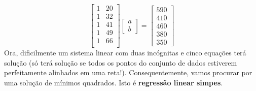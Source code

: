 \documentclass[../livro.tex]{subfiles}  %
\begin{document}
\begin{example}
\begin{equation}
  \begin{bmatrix}
    1 & 20 \\
    1 & 32 \\
    1 & 41 \\
    1 & 49 \\
    1 & 66 \\
  \end{bmatrix}
  \begin{bmatrix}
    a \\ b
  \end{bmatrix} =
  \begin{bmatrix}
    590 \\ 410 \\ 460 \\ 380 \\ 350
  \end{bmatrix}
  \end{equation} Ora, dificilmente um sistema linear com duas incógnitas e cinco equações terá solução (só terá solução se todos os pontos do conjunto de dados estiverem perfeitamente alinhados em uma reta!). Consequentemente, vamos procurar por uma solução de mínimos quadrados. Isto é \textbf{regressão linear simpes}.


\end{example}
\end{document}
